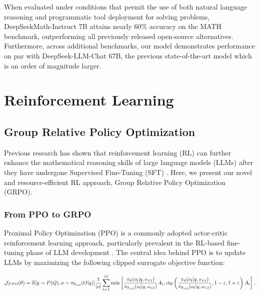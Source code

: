 \begin{itemize}[topsep=0pt]
\begin{itemize}[topsep=0pt]
When evaluated under conditions that permit the use of both natural language reasoning and programmatic tool deployment for solving problems, DeepSeekMath-Instruct 7B attains nearly 60\% accuracy on the MATH benchmark, outperforming all previously released open-source alternatives. Furthermore, across additional benchmarks, our model demonstrates performance on par with DeepSeek-LLM-Chat 67B, the previous state-of-the-art model which is an order of magnitude larger.

\section{Reinforcement Learning}

\subsection{Group Relative Policy Optimization} Previous research has shown that reinforcement learning (RL) can further enhance the mathematical reasoning skills of large language models (LLMs) after they have undergone Supervised Fine-Tuning (SFT) \citep{wang2023math,wizardmath}. Here, we present our novel and resource-efficient RL approach, Group Relative Policy Optimization (GRPO).

\subsubsection{From PPO to GRPO} Proximal Policy Optimization (PPO) \citep{schulman2017proximal} is a commonly adopted actor-critic reinforcement learning approach, particularly prevalent in the RL-based fine-tuning phase of LLM development \citep{ouyang2022training}. The central idea behind PPO is to update LLMs by maximizing the following clipped surrogate objective function:

\begin{equation}
\footnotesize
    \mathcal{J}_{PPO}(\theta) = \mathbb{E}{[q \sim P(Q), o \sim \pi_{\theta_{old}}(O|q)]} \frac{1}{|o|} \sum_{t=1}^{|o|} \min \left[ \frac{\pi_\theta(o_{t} | q, o_{<t})}{\pi_{\theta_{old}}(o_{t} | q, o_{<t})} A_{t}, \text{clip} \left( \frac{\pi_\theta(o_{t} | q, o_{<t})}{\pi_{\theta_{old}}(o_{t} | q, o_{<t})}, 1 - \varepsilon, 1 + \varepsilon \right)  A_{t} \right] ,
\end{equation}


\end{itemize}
\end{itemize}
